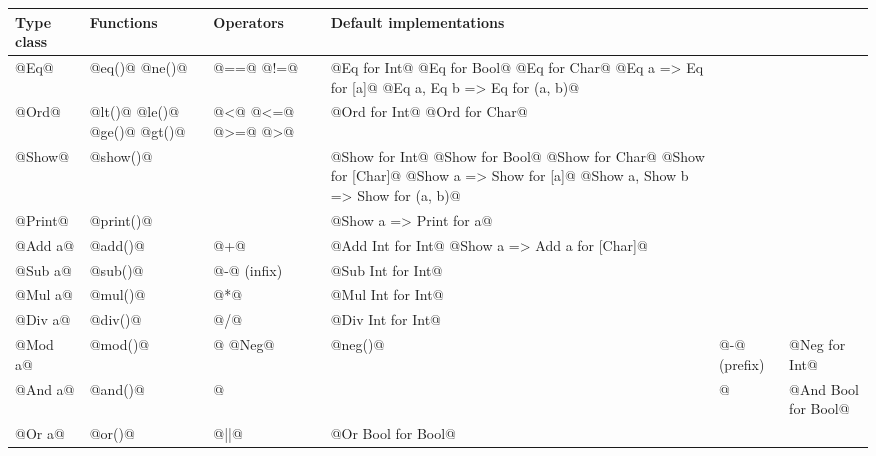 \begin{table}[H]
\centering
\begin{tabular}{|p{5em}|p{5em}|p{5em}|p{20em}|}
\hline
Type class & Functions & Operators & Default implementations \\ \hline
@Eq@ & @eq()@ \newline @ne()@ & @==@ \newline @!=@ & @Eq for Int@ \newline @Eq for Bool@ \newline @Eq for Char@ \newline @Eq a => Eq for [a]@ \newline @Eq a, Eq b => Eq for (a, b)@ \\ \hline
@Ord@ & @lt()@ \newline @le()@ \newline @ge()@ \newline @gt()@ & @<@ \newline @<=@ \newline @>=@ \newline @>@ & @Ord for Int@ \newline @Ord for Char@ \\ \hline
@Show@ & @show()@ & & @Show for Int@ \newline @Show for Bool@ \newline @Show for Char@ \newline @Show for [Char]@ \newline @Show a => Show for [a]@ \newline @Show a, Show b => Show for (a, b)@ \\ \hline
@Print@ & @print()@ & & @Show a => Print for a@ \\ \hline
@Add a@ & @add()@ & @+@ & @Add Int for Int@ \newline @Show a => Add a for [Char]@ \\ \hline
@Sub a@ & @sub()@ & @-@ (infix) & @Sub Int for Int@ \\ \hline
@Mul a@ & @mul()@ & @*@ & @Mul Int for Int@ \\ \hline
@Div a@ & @div()@ & @/@ & @Div Int for Int@ \\ \hline
@Mod a@ & @mod()@ & @%
@Neg@ & @neg()@ & @-@ (prefix) & @Neg for Int@ \\ \hline
@And a@ & @and()@ & @&&@ & @And Bool for Bool@ \\ \hline
@Or a@ & @or()@ & @||@ & @Or Bool for Bool@ \\ \hline

\end{tabular}
\end{table}
